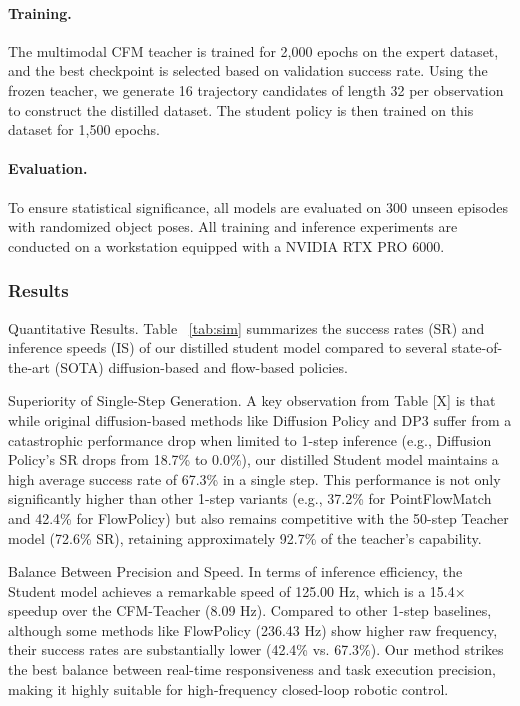 \paragraph{Training.}
The multimodal CFM teacher is trained for 2,000 epochs on the expert dataset, and the best checkpoint is selected based on validation success rate.
Using the frozen teacher, we generate 16 trajectory candidates of length 32 per observation to construct the distilled dataset.
The student policy is then trained on this dataset for 1,500 epochs.

\paragraph{Evaluation.} To ensure statistical significance, all models are evaluated on 300 unseen episodes with randomized object poses. All training and inference experiments are conducted on a workstation equipped with a NVIDIA RTX PRO 6000.



\subsubsection{Results}

Quantitative Results. Table ~\ref{tab:sim} summarizes the success rates (SR) and inference speeds (IS) of our distilled student model compared to several state-of-the-art (SOTA) diffusion-based and flow-based policies.

Superiority of Single-Step Generation. A key observation from Table [X] is that while original diffusion-based methods like Diffusion Policy and DP3 suffer from a catastrophic performance drop when limited to 1-step inference (e.g., Diffusion Policy’s SR drops from 18.7\% to 0.0\%), our distilled Student model maintains a high average success rate of 67.3\% in a single step. This performance is not only significantly higher than other 1-step variants (e.g., 37.2\% for PointFlowMatch and 42.4\% for FlowPolicy) but also remains competitive with the 50-step Teacher model (72.6\% SR), retaining approximately 92.7\% of the teacher's capability.

Balance Between Precision and Speed. In terms of inference efficiency, the Student model achieves a remarkable speed of 125.00 Hz, which is a 15.4$\times$ speedup over the CFM-Teacher (8.09 Hz). Compared to other 1-step baselines, although some methods like FlowPolicy (236.43 Hz) show higher raw frequency, their success rates are substantially lower (42.4\% vs. 67.3\%). Our method strikes the best balance between real-time responsiveness and task execution precision, making it highly suitable for high-frequency closed-loop robotic control.

